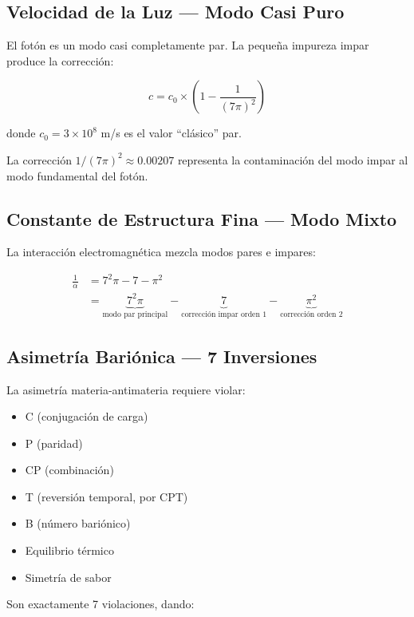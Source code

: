 \subsection{Velocidad de la Luz --- Modo Casi Puro}

El fotón es un modo casi completamente par. La pequeña impureza impar
produce la corrección:

\begin{equation}
c = c_0 \times \left(1 - \frac{1}{(7\pi)^2}\right)
\end{equation}

donde $c_0 = 3 \times 10^8$ m/s es el valor ``clásico'' par.

La corrección $1/(7\pi)^2 \approx 0.00207$ representa la contaminación del modo
impar al modo fundamental del fotón.

\subsection{Constante de Estructura Fina --- Modo Mixto}

La interacción electromagnética mezcla modos pares e impares:

\begin{align}
\frac{1}{\alpha} &= 7^2\pi - 7 - \pi^2\\
&= \underbrace{7^2\pi}_{\text{modo par principal}} - \underbrace{7}_{\text{corrección impar orden 1}} - \underbrace{\pi^2}_{\text{corrección orden 2}}
\end{align}

\subsection{Asimetría Bariónica --- 7 Inversiones}

La asimetría materia-antimateria requiere violar:
\begin{itemize}
    \item C (conjugación de carga)
    \item P (paridad)
    \item CP (combinación)
    \item T (reversión temporal, por CPT)
    \item B (número bariónico)
    \item Equilibrio térmico
    \item Simetría de sabor
\end{itemize}

Son exactamente 7 violaciones, dando:

